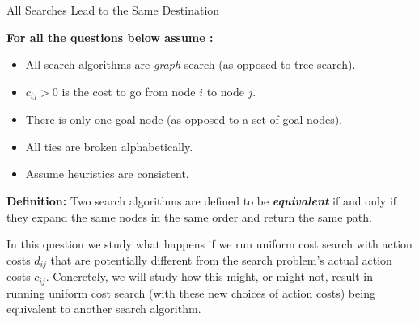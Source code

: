 \newcommand{\inlineq}[1]{$\displaystyle{#1}$}

\begin{problem}{All Searches Lead to the Same Destination}

{\bf For all the questions below assume :}
\begin{itemize}
\item All search algorithms are \emph{graph} search (as opposed to
  tree search).
\item $c_{ij} > 0$ is the cost to go from node $i$ to node $j$.
\item There is only one goal node (as opposed to a set of goal nodes).
\item All ties are broken alphabetically.
\item Assume heuristics are consistent.
\end{itemize}


{\bf Definition:} Two search algorithms are defined to be {\bf\emph{equivalent}} if and only if they expand the same nodes in the same order and return the same path.

In this question we study what happens if we run uniform cost
search with action costs $d_{ij}$ that are potentially different from the search problem's actual action costs $c_{ij}$.   Concretely, we will study how this might, or might
not, result in running uniform cost search (with these new
choices of action costs) being equivalent to another search
algorithm. 


\end{problem}
